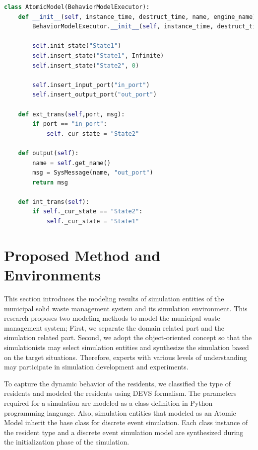 \documentclass{scsSimAUDPaperFormat}
\begin{document}
\begin{lstlisting}[language=Python, caption=Example Code of Atomic Model, label={lst:atomic}]
class AtomicModel(BehaviorModelExecutor):
    def __init__(self, instance_time, destruct_time, name, engine_name):
        BehaviorModelExecutor.__init__(self, instance_time, destruct_time, name, engine_name)

        self.init_state("State1")
        self.insert_state("State1", Infinite)
        self.insert_state("State2", 0)

        self.insert_input_port("in_port")
        self.insert_output_port("out_port")

    def ext_trans(self,port, msg):
        if port == "in_port":
            self._cur_state = "State2"

    def output(self):
        name = self.get_name()
        msg = SysMessage(name, "out_port")
        return msg
        
    def int_trans(self):
        if self._cur_state == "State2":
            self._cur_state = "State1"
\end{lstlisting}

\section{Proposed Method and Environments}

This section introduces the modeling results of simulation entities of the municipal solid waste management system and its simulation environment. This research proposes two modeling methods to model the municipal waste management system; First, we separate the domain related part and the simulation related part. Second, we adopt the object-oriented concept so that the simulationists may select simulation entities and synthesize the simulation based on the target situations. Therefore, experts with various levels of understanding may participate in simulation development and experiments.

To capture the dynamic behavior of the residents, we classified the type of residents and modeled the residents using DEVS formalism. The parameters required for a simulation are modeled as a class definition in Python programming language. Also, simulation entities that modeled as an Atomic Model inherit the base class for discrete event simulation. Each class instance of the resident type and a discrete event simulation model are synthesized during the initialization phase of the simulation. 
\end{document}
